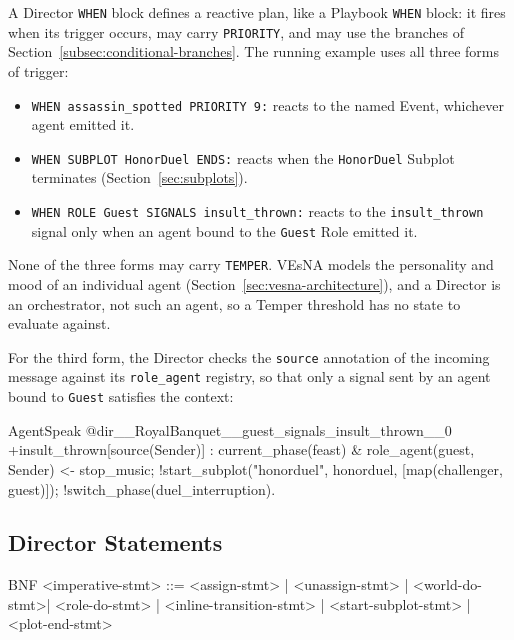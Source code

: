 A Director \lstinline|WHEN| block defines a reactive plan, like a Playbook \lstinline|WHEN| block: it fires when its trigger occurs, may carry \lstinline|PRIORITY|, and may use the branches of Section~\ref{subsec:conditional-branches}. The running example uses all three forms of trigger:
 
\begin{itemize}
    \item \lstinline|WHEN assassin_spotted PRIORITY 9:| reacts to the named Event, whichever agent emitted it.
    \item \lstinline|WHEN SUBPLOT HonorDuel ENDS:| reacts when the \lstinline|HonorDuel| Subplot terminates (Section~\ref{sec:subplots}).
    \item \lstinline|WHEN ROLE Guest SIGNALS insult_thrown:| reacts to the \lstinline|insult_thrown| signal only when an agent bound to the \lstinline|Guest| Role emitted it.
\end{itemize}
 
None of the three forms may carry \lstinline|TEMPER|. VEsNA models the personality and mood of an individual agent (Section~\ref{sec:vesna-architecture}), and a Director is an orchestrator, not such an agent, so a Temper threshold has no state to evaluate against.
 
For the third form, the Director checks the \lstinline|source| annotation of the incoming message against its \lstinline|role_agent| registry, so that only a signal sent by an agent bound to \lstinline|Guest| satisfies the context:
 
\begin{codeblock}[]{AgentSpeak}
@dir__RoyalBanquet__guest_signals_insult_thrown__0
+insult_thrown[source(Sender)] : current_phase(feast)
    & role_agent(guest, Sender) <-
    stop_music;
    !start_subplot("honorduel", honorduel, [map(challenger, guest)]);
    !switch_phase(duel_interruption).
\end{codeblock}
 
\subsection{Director Statements}
\begin{codeblock}[]{BNF}
    <imperative-stmt>   ::= <assign-stmt> | <unassign-stmt> 
                          | <world-do-stmt>| <role-do-stmt> 
                          | <inline-transition-stmt>
                          | <start-subplot-stmt> | <plot-end-stmt>
\end{codeblock}
 
